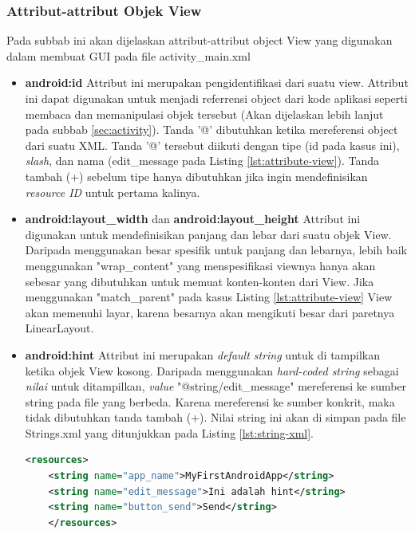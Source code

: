 \subsubsection{Attribut-attribut Objek View}
\label{sssec:attribut_attribut_objek_view}
Pada subbab ini akan dijelaskan attribut-attribut object View yang digunakan dalam membuat GUI pada file activity\_main.xml
\begin{itemize}
	\item \textbf{android:id}
	Attribut ini merupakan pengidentifikasi dari suatu view. Attribut ini dapat digunakan untuk menjadi referrensi object dari kode aplikasi seperti membaca dan memanipulasi objek tersebut (Akan dijelaskan lebih lanjut pada subbab \ref{sec:activity}). Tanda '@' dibutuhkan ketika mereferensi object dari suatu XML. Tanda '@' tersebut diikuti dengan tipe (id pada kasus ini), \textit{slash}, dan nama (edit\_message pada Listing \ref{lst:attribute-view}). Tanda tambah (+) sebelum tipe hanya dibutuhkan jika ingin mendefinisikan \textit{resource ID} untuk pertama kalinya.
	\item \textbf{android:layout\_width} dan \textbf{android:layout\_height}
	Attribut ini digunakan untuk mendefinisikan panjang dan lebar dari suatu objek View. Daripada menggunakan besar spesifik untuk panjang dan lebarnya, lebih baik menggunakan "wrap\_content" yang menspesifikasi viewnya hanya akan sebesar yang dibutuhkan untuk memuat konten-konten dari View. Jika menggunakan "match\_parent" pada kasus Listing \ref{lst:attribute-view} View akan memenuhi layar, karena besarnya akan mengikuti besar dari paretnya LinearLayout.


	\item \textbf{android:hint}
	Attribut ini merupakan \textit{default string} untuk di tampilkan ketika objek View kosong. Daripada menggunakan \textit{hard-coded string} sebagai \textit{nilai} untuk ditampilkan, \textit{value} "@string/edit\_message" mereferensi ke sumber string pada file yang berbeda. Karena mereferensi ke sumber konkrit, maka tidak dibutuhkan tanda tambah (+). Nilai string ini akan di simpan pada file Strings.xml yang ditunjukkan pada Listing \ref{lst:string-xml}.
	\begin{lstlisting}[caption={Contoh kode pada string.xml},label={lst:string-xml},language=xml]
	<resources>
    <string name="app_name">MyFirstAndroidApp</string>
    <string name="edit_message">Ini adalah hint</string>
    <string name="button_send">Send</string>
	</resources>

\end{lstlisting}



\end{itemize}
